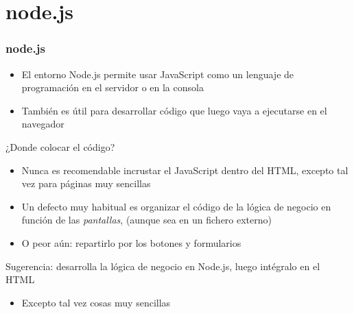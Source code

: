 \documentclass[ucs]{beamer}
\begin{document}
\section{node.js}
\begin{frame}[fragile]
\frametitle{node.js}
\begin{itemize}
\item
El entorno Node.js permite usar JavaScript como un lenguaje de programación
en el servidor o en la consola

\item
También es útil para desarrollar código que luego vaya a ejecutarse en el navegador
\end{itemize}

¿Donde colocar el código?

    \begin{itemize}
    \item
Nunca es recomendable incrustar el JavaScript dentro del HTML, excepto tal
vez para páginas muy sencillas

    \item
Un defecto muy habitual es organizar el código de la lógica de negocio en función de las \emph{pantallas}, (aunque
sea en un fichero externo)

    \item
O peor aún: repartirlo por los botones y formularios
    \end{itemize}

Sugerencia: desarrolla la lógica de negocio en Node.js, luego
intégralo en el HTML

    \begin{itemize}
    \item
Excepto tal vez cosas muy sencillas
    \end{itemize}

\end{frame}
\end{document}
